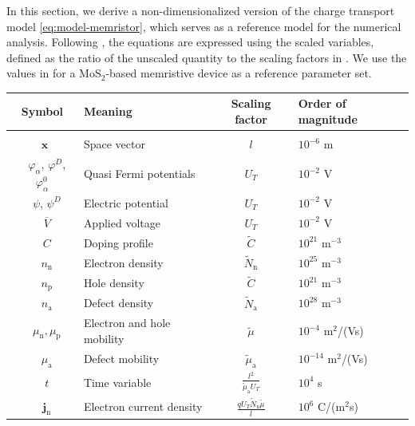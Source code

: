 \documentclass[10pt,a4paper, final]{article}
\def\electrons{\text{n}}
\def\holes{\text{p}}
\def\ions{\text{a}}
\theoremstyle{definition}								%
\numberwithin{equation}{section}
\numberwithin{figure}{section}
\numberwithin{theorem}{section}
\begin{document}
In this section, we derive a non-dimensionalized version of the charge transport model \eqref{eq:model-memristor}, which serves as a reference model for the numerical analysis.
Following \cite[Section 2.4]{markowich1985stationary}, the equations are expressed using the scaled variables, defined as the ratio of the unscaled quantity to the scaling factors in .
We use the values in  for a MoS$_2$-based memristive device as a reference parameter set.

\begin{table}[!ht]
\centering
{\footnotesize
    \begin{tabular}{|c|l|c|l|}
            \hline Symbol & Meaning & Scaling factor & Order of magnitude \\\hline&&&\\
            $\:\:\mathbf{x}$ & Space vector & $l$ & $10^{-6}$ m\\[2.0ex]
            ~
            $\varphi_\alpha$, $\varphi^D$, $\varphi_\alpha^0$  &  Quasi Fermi potentials & $U_T$& $10^{-2}$ V\\[2.0ex]
            ~
            $\psi$, $\psi^D$ & Electric potential & $U_T$ & $10^{-2}$ V\\[2.0ex]
            ~
            $\overline{V}$ & Applied voltage & $U_T$ & $10^{-2}$ V\\[2.0ex]
            ~
            $C$ & Doping profile & $\tilde{C}$ & $10^{21}$ m$^{-3}$\\[2.0ex]
            ~
            $n_\electrons$ & Electron density & $\tilde{N}_\electrons$ & $10^{25}$ m$^{-3}$\\[2.0ex]
            ~
            $n_\holes$ & Hole density & $\tilde{C}$ & $10^{21}$ m$^{-3}$\\[2.0ex]
            ~
            $n_\ions$ & Defect density & $\tilde{N}_\ions$ & $10^{28}$ m$^{-3}$\\[2.0ex]
            ~
            $\mu_\electrons,\mu_\holes$ & Electron and hole mobility & $\tilde{\mu}$ & $10^{-4}$ m$^2$/(Vs)\\[2.0ex]
            ~
            $\mu_\ions$ & Defect mobility & $\tilde{\mu}_\ions$&$10^{-14}$ m$^2$/(Vs)\\[2.0ex]
            ~
            $t$ & Time variable & $\displaystyle\frac{l^2}{\tilde{\mu}_\ions U_T}$& $10^{4}$ s\\[2.0ex]
            ~
            $\mathbf{j}_\electrons$ & Electron current density & $\displaystyle\frac{q U_T \tilde{N}_\electrons \tilde{\mu}}{l}$&  $10^{6}$ C/(m$^2$s)\\[2.0ex]

\end{tabular}}
\end{table}
\end{document}
